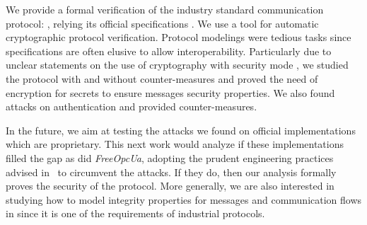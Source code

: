 We provide a formal verification of the industry standard
communication protocol: \opcua, relying its official specifications
\cite{MLD09,opcua_part2,opcua_part4,opcua_part6}.
We use \proverif{} a tool for automatic cryptographic protocol
verification.  Protocol modelings were tedious tasks since
specifications are often elusive to allow interoperability.
Particularly due to unclear statements on the use of cryptography with
security mode \sms, we studied the protocol with and without
counter-measures and proved the need of encryption for secrets to
ensure messages security properties.  We also found attacks on
authentication and provided counter-measures.

In the future, we aim at testing the attacks we found on official
implementations which are proprietary. This next work would analyze
if these implementations filled the gap as did {\em FreeOpcUa}, 
adopting the prudent engineering practices advised in~\cite{AN96} to
circumvent the attacks.
If they do, then our analysis formally proves the security of the protocol.
More generally, we are also interested in
studying how to model integrity properties for messages and
communication flows in \proverif{} since it is one of the requirements
of industrial protocols.
